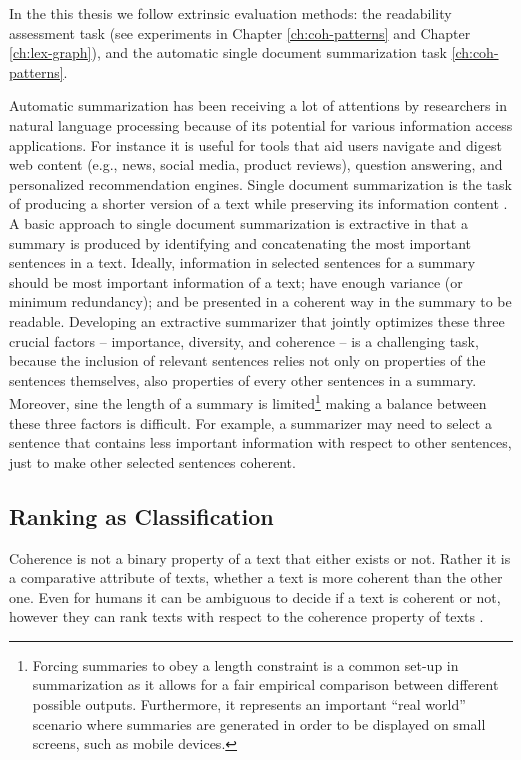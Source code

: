 In the this thesis we follow extrinsic evaluation methods: the readability assessment task (see experiments in Chapter \ref{ch:coh-patterns} and Chapter \ref{ch:lex-graph}), and the automatic single document summarization task \ref{ch:coh-patterns}. 

Automatic summarization has been receiving a lot of attentions by researchers in natural language processing because of its potential for various information access applications. 
For instance it is useful for tools that aid users navigate and digest web content (e.g., news, social media, product reviews), question answering, and personalized recommendation engines. 
Single document summarization is the task of producing a shorter version of a text while preserving its information content \cite{nenkova11}. 
A basic approach to single document summarization is extractive in that a summary is produced by identifying and concatenating the most important sentences in a text. 
Ideally, information in selected sentences for a summary should be most important information of a text; have enough variance (or minimum redundancy); and be presented in a coherent way in the summary to be readable. 
Developing an extractive summarizer that jointly optimizes these three crucial factors -- importance, diversity, and coherence -- is a challenging task, because the inclusion of relevant sentences relies not only on properties of the sentences themselves, also properties of every other sentences in a summary. 
Moreover, sine the length of a summary is limited\footnote{Forcing summaries to obey a length constraint is a common set-up in summarization as it allows for a fair empirical comparison between different possible outputs. 
 Furthermore, it represents an important ``real world'' scenario where summaries are generated in order to be displayed on small screens, such as mobile devices.
} making a balance between these three factors is difficult. 
For example, a summarizer may need to select a sentence that contains less important information with respect to other sentences, just to make other selected sentences coherent. 



\subsection{Ranking as Classification} 

Coherence is not a binary property of a text that either exists or not. 
Rather it is a comparative attribute of texts, whether a text is more coherent than the other one. 
Even for humans it can be ambiguous to decide if a text is coherent or not, however they can rank texts with respect to the coherence property of texts \cite{halliday76}.   

